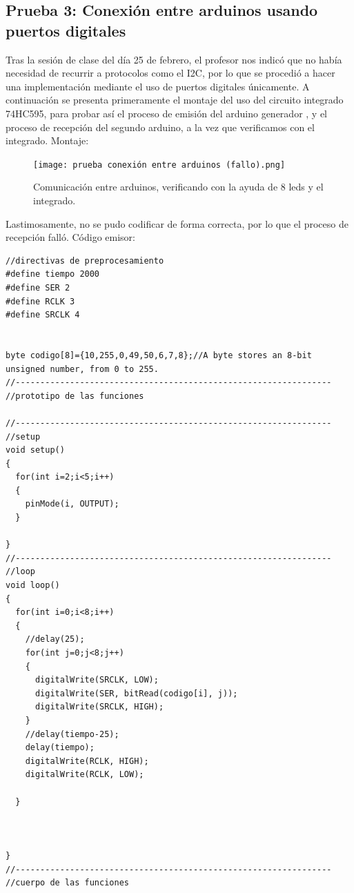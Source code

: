 \documentclass{article}
\begin{document}
\subsection{Prueba 3: Conexión entre arduinos usando puertos digitales}\label{intento3}
Tras la sesión de clase del día 25 de febrero, el profesor nos indicó que no había necesidad de recurrir a protocolos como el I2C, por lo que se procedió a hacer una implementación mediante el uso de puertos digitales únicamente. \newline A continuación se presenta primeramente el montaje del uso del circuito integrado 74HC595, para probar así el proceso de emisión del arduino generador , y el proceso de recepción del segundo arduino, a la vez que verificamos con el integrado.
\newline Montaje: \newline \newline \newline

\begin{figure}[h]
\texttt{[image: prueba conexión entre arduinos (fallo).png]}
\centering
\caption{Comunicación entre arduinos, verificando con la ayuda de 8 leds y el integrado.}
\label{fig:reemplazo pulsador por arduino}
\end{figure}
Lastimosamente, no se pudo codificar de forma correcta, por lo que el proceso de recepción falló.
\newline Código emisor:
\begin{lstlisting}[style=myArduino]
//directivas de preprocesamiento
#define tiempo 2000
#define SER 2
#define RCLK 3
#define SRCLK 4


byte codigo[8]={10,255,0,49,50,6,7,8};//A byte stores an 8-bit unsigned number, from 0 to 255.
//----------------------------------------------------------------
//prototipo de las funciones

//----------------------------------------------------------------
//setup
void setup()
{
  for(int i=2;i<5;i++)
  {
    pinMode(i, OUTPUT);
  }
  
}
//----------------------------------------------------------------
//loop
void loop()
{
  for(int i=0;i<8;i++)
  {
  	//delay(25);
    for(int j=0;j<8;j++)
    {
      digitalWrite(SRCLK, LOW);
      digitalWrite(SER, bitRead(codigo[i], j));
      digitalWrite(SRCLK, HIGH);
    }
    //delay(tiempo-25);
    delay(tiempo);
    digitalWrite(RCLK, HIGH);
    digitalWrite(RCLK, LOW);
    
  }
  
  
  
}
//----------------------------------------------------------------
//cuerpo de las funciones
\end{lstlisting}
\end{document}
